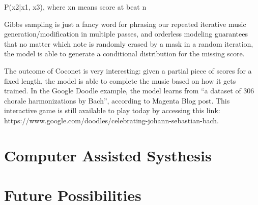\documentclass[jou]{apa6}
\begin{document}
P(x2|x1, x3), where xn means score at beat n 

Gibbs sampling is just a fancy word for phrasing our repeated iterative music generation/modification in multiple passes, and orderless modeling guarantees that no matter which note is randomly erased by a mask in a random iteration, the model is able to generate a conditional distribution for the missing score.

The outcome of Coconet is very interesting: given a partial piece of scores for a fixed length, the model is able to complete the music based on how it gets trained. In the Google Doodle example, the model learns from “a dataset of 306 chorale harmonizations by Bach”, according to Magenta Blog post. This interactive game is still available to play today by accessing this link: https://www.google.com/doodles/celebrating-johann-sebastian-bach.


\section{Computer Assisted Systhesis}


\section{Future Possibilities}


\printbibliography
\end{document}
